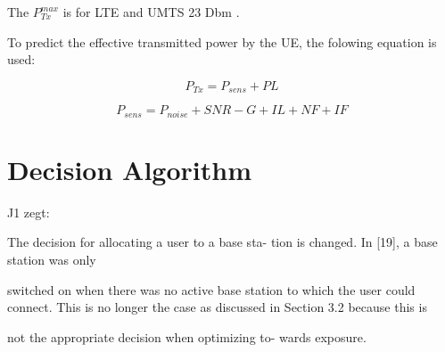The $P^{max}_{Tx}$ is for LTE and UMTS 23 Dbm \cite{J11_maxTpxUE, J10_RDP}.

To predict the effective transmitted power by the \gls{UE}, the folowing equation is used:

\begin{equation}
P_{Tx} = P_{sens} + PL
\label{eq:calculatesar}
\end{equation}

\begin{equation}
P_{sens} = P_{noise} + SNR - G + IL + NF + IF
\label{eq:calculatepsens}
\end{equation}


\section{Decision Algorithm}

J1 zegt:

The decision for allocating a user to a base sta-
tion is changed. In [19], a base station was only

switched on when there was no active base station
to which the user could connect. This is no longer
the case as discussed in Section 3.2 because this is

not the appropriate decision when optimizing to-
wards exposure.